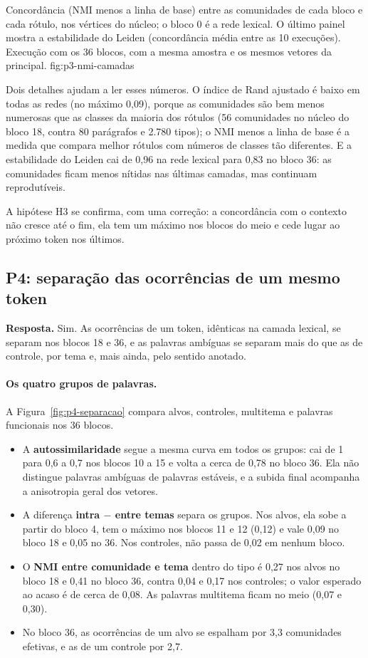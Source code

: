     {Concordância (NMI menos a linha de base) entre as comunidades de cada bloco e cada rótulo,
    nos vértices do núcleo; o bloco 0 é a rede lexical. O último painel mostra a estabilidade
    do Leiden (concordância média entre as 10 execuções). Execução com os 36 blocos, com a
    mesma amostra e os mesmos vetores da principal.}
    {fig:p3-nmi-camadas}

Dois detalhes ajudam a ler esses números. O índice de Rand ajustado é baixo em todas as
redes (no máximo 0,09), porque as comunidades são bem menos numerosas que as classes da
maioria dos rótulos (56 comunidades no núcleo do bloco 18, contra 80 parágrafos e 2.780 tipos);
o NMI menos a linha de base é a medida que compara melhor rótulos com números de classes tão
diferentes. E a estabilidade do Leiden cai de 0,96 na rede lexical para 0,83 no bloco 36: as
comunidades ficam menos nítidas nas últimas camadas, mas continuam reprodutíveis.

A hipótese H3 se confirma, com uma correção: a concordância com o contexto não cresce até o
fim, ela tem um máximo nos blocos do meio e cede lugar ao próximo token nos últimos.

\subsection{P4: separação das ocorrências de um mesmo token}\label{sec:res-p4}

\textbf{Resposta.} Sim. As ocorrências de um token, idênticas na camada lexical, se separam
nos blocos 18 e 36, e as palavras ambíguas se separam mais do que as de controle, por tema e,
mais ainda, pelo sentido anotado.

\paragraph{Os quatro grupos de palavras.} A Figura~\ref{fig:p4-separacao} compara alvos,
controles, multitema e palavras funcionais nos 36 blocos.
\begin{itemize}
    \item A \textbf{autossimilaridade} segue a mesma curva em todos os grupos: cai de 1 para
    0,6 a 0,7 nos blocos 10 a 15 e volta a cerca de 0,78 no bloco 36. Ela não distingue
    palavras ambíguas de palavras estáveis, e a subida final acompanha a anisotropia geral dos
    vetores.
    \item A diferença \textbf{intra $-$ entre temas} separa os grupos. Nos alvos, ela sobe a
    partir do bloco 4, tem o máximo nos blocos 11 e 12 (0,12) e vale 0,09 no bloco 18 e 0,05
    no 36. Nos controles, não passa de 0,02 em nenhum bloco.
    \item O \textbf{NMI entre comunidade e tema} dentro do tipo é 0,27 nos alvos no bloco 18 e
    0,41 no bloco 36, contra 0,04 e 0,17 nos controles; o valor esperado ao acaso é de cerca de
    0,08. As palavras multitema ficam no meio (0,07 e 0,30).
    \item No bloco 36, as ocorrências de um alvo se espalham por 3,3 comunidades efetivas, e as
    de um controle por 2,7.
\end{itemize}

